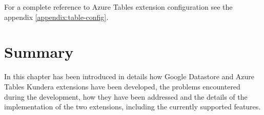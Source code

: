\noindent For a complete reference to Azure Tables extension configuration see the appendix \ref{appendix:table-config}.

\section{Summary}
In this chapter has been introduced in details how Google Datastore and Azure Tables Kundera extensions have been developed, the problems encountered during the development, how they have been addressed and the details of the implementation of the two extensions, including the currently supported features.

